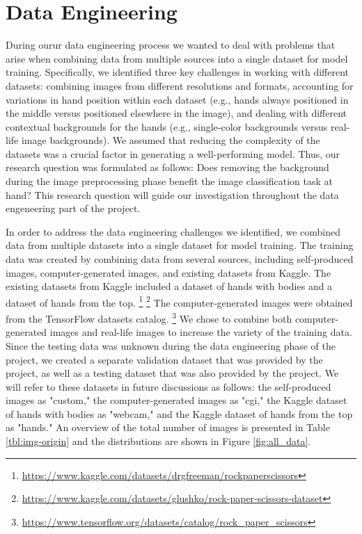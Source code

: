 \documentclass[a4paper]{article}
\begin{document}
\section{Data Engineering}
During ourur data engineering process we wanted to deal with problems that arise when combining data from multiple sources into a single dataset for model training. Specifically, we identified three key challenges in working with different datasets: combining images from different resolutions and formats, accounting for variations in hand position within each dataset (e.g., hands always positioned in the middle versus positioned elsewhere in the image), and dealing with different contextual backgrounds for the hands (e.g., single-color backgrounds versus real-life image backgrounds). We assumed that reducing the complexity of the datasets was a crucial factor in generating a well-performing model. Thus, our research question was formulated as follows: Does removing the background during the image preprocessing phase benefit the image classification task at hand? This research question will guide our investigation throughout the data engeneering part of the project.


In order to address the data engineering challenges we identified, we combined data from multiple datasets into a single dataset for model training. The training data was created by combining data from several sources, including self-produced images, computer-generated images, and existing datasets from Kaggle. The existing datasets from Kaggle included a dataset of hands with bodies and a dataset of hands from the top. \footnote{\url{https://www.kaggle.com/datasets/drgfreeman/rockpaperscissors}} \footnote{\url{https://www.kaggle.com/datasets/glushko/rock-paper-scissors-dataset}} The computer-generated images were obtained from the TensorFlow datasets catalog. \footnote{\url{https://www.tensorflow.org/datasets/catalog/rock_paper_scissors}} We chose to combine both computer-generated images and real-life images to increase the variety of the training data. Since the testing data was unknown during the data engineering phase of the project, we created a separate validation dataset that was provided by the project, as well as a testing dataset that was also provided by the project. We will refer to these datasets in future discussions as follows: the self-produced images as "custom," the computer-generated images as "cgi," the Kaggle dataset of hands with bodies as "webcam," and the Kaggle dataset of hands from the top as "hands." An overview of the total number of images is presented in Table \ref{tbl:img-origin} and the distributions are shown in Figure \ref{fig:all_data}.
\end{document}
